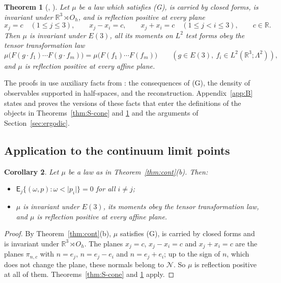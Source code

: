 \documentclass[11pt]{amsart}
\theoremstyle{plain}
\newtheorem{theorem}{Theorem}[section]
\newtheorem{corollary}[theorem]{Corollary}
\theoremstyle{definition}
\theoremstyle{remark}
\numberwithin{equation}{section}
\newcommand{\R}{\mathbb{R}}
\newcommand{\cN}{\mathcal{N}}
\newcommand{\Oh}{O_h}
\newcommand{\Eu}{E(3)}
\newcommand{\abs}[1]{\lvert #1\rvert}
\begin{document}
\begin{theorem}[{\cite[Thm.~18.21, p.~123]{S}, \cite[Thm.~1.2, p.~4]{S}}]\label{thm:S-rot}
Let $\mu$ be a law which satisfies (G), is carried by closed forms, is invariant under $\R^3\rtimes\Oh$, and is reflection positive at every plane
\[
x_j=c\quad(1\le j\le3),\qquad x_j-x_i=c,\qquad x_j+x_i=c\quad(1\le j<i\le3),\qquad c\in\R .
\]
Then $\mu$ is invariant under $\Eu$, all its moments on $L^2$ test forms obey the tensor transformation law
\[
\mu\big(F(g\cdot f_1)\cdots F(g\cdot f_m)\big)=\mu\big(F(f_1)\cdots F(f_m)\big)\qquad(g\in\Eu,\ f_i\in L^2(\R^3;\Lambda^2)),
\]
and $\mu$ is reflection positive at every affine plane.
\end{theorem}

The proofs in \cite[Sect.~18]{S} use auxiliary facts from \cite[Sects.~15 and 17]{S}: the consequences of (G), the density of observables supported in half-spaces, and the reconstruction. Appendix~\ref{app:B} states and proves the versions of these facts that enter the definitions of the objects in Theorems~\ref{thm:S-cone} and \ref{thm:S-rot} and the arguments of Section~\ref{sec:ergodic}.

\subsection{Application to the continuum limit points}

\begin{corollary}\label{cor:rot}
Let $\mu$ be a law as in Theorem~\ref{thm:cont}(b). Then:
\begin{itemize}
\item[(a)] $\mathsf E_j\{(\omega,p):\omega<\abs{p_i}\}=0$ for all $i\ne j$;
\item[(b)] $\mu$ is invariant under $\Eu$, its moments obey the tensor transformation law, and $\mu$ is reflection positive at every affine plane.
\end{itemize}
\end{corollary}

\begin{proof}
By Theorem~\ref{thm:cont}(b), $\mu$ satisfies (G), is carried by closed forms and is invariant under $\R^3\rtimes\Oh$. The planes $x_j=c$, $x_j-x_i=c$ and $x_j+x_i=c$ are the planes $\pi_{n,c}$ with $n=e_j$, $n=e_j-e_i$ and $n=e_j+e_i$; up to the sign of $n$, which does not change the plane, these normals belong to $\cN$. So $\mu$ is reflection positive at all of them. Theorems~\ref{thm:S-cone} and \ref{thm:S-rot} apply.
\end{proof}
\end{document}
